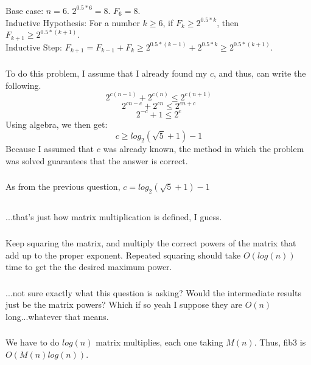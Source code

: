 \documentclass{article}
\begin{document}
\subsubsection{}
Base case: $n = 6$. $2^{0.5*6} = 8$. $F_6 = 8$.\\
Inductive Hypothesis: For a number $k \geq 6$, if $F_k \geq 2^{0.5*k}$, then $F_{k+1} \geq 2^{0.5*(k + 1)}$.\\
Inductive Step: $F_{k+1} = F_{k-1} + F_k \geq 2^{0.5*(k-1)} + 2^{0.5*k} \geq 2^{0.5*(k+1)}$. 
\subsubsection{}
To do this problem, I assume that I already found my $c$, and thus, can write the following. 
$$2^{c(n-1)}+2^{c(n)} \leq 2^{c(n+1)}$$
$$2^{cn-c}+2^{cn} \leq 2^{cn+c}$$
$$2^{-c}+1 \leq 2^{c}$$
Using algebra, we then get: $$c \geq log_2(\sqrt{5}+1)-1$$
Because I assumed that $c$ was already known, the method in which the problem was solved guarantees that the answer is correct. 
\subsubsection{}As from the previous question, $c = log_2(\sqrt{5}+1)-1$
\subsection{}
\subsubsection{}...that's just how matrix multiplication is defined, I guess.
\subsubsection{}Keep squaring the matrix, and multiply the correct powers of the matrix that add up to the proper exponent. Repeated squaring should take $O(log(n))$ time to get the the desired maximum power.
\subsubsection{}...not sure exactly what this question is asking? Would the intermediate results just be the matrix powers? Which if so yeah I suppose they are $O(n)$ long...whatever that means. 
\subsubsection{}We have to do $log(n)$ matrix multiplies, each one taking $M(n)$. Thus, fib3 is $O(M(n)log(n))$.
\end{document}
